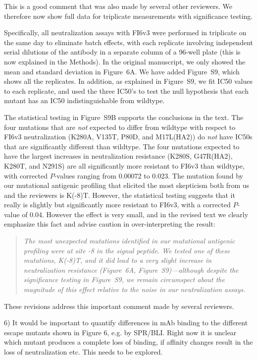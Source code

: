 \documentclass[11pt, oneside]{article}   	%
\begin{document}
{\color{black}
This is a good comment that was also made by several other reviewers.
We therefore now show full data for triplicate measurements with significance testing.

Specifically, all neutralization assays with FI6v3 were performed in triplicate on the same day to eliminate batch effects, with each replicate involving independent serial dilutions of the antibody in a separate column of a 96-well plate (this is now explained in the Methods).
In the original manuscript, we only showed the mean and standard deviation in Figure~6A.
We have added Figure~S9, which shows all the replicates.
In addition, as explained in Figure~S9, we fit IC50 values to each replicate, and used the three IC50's to test the null hypothesis that each mutant has an IC50 indistinguishable from wildtype.

The statistical testing in Figure~S9B supports the conclusions in the text. 
The four mutations that are \emph{not} expected to differ from wildtype with respect to FI6v3 neutralization (K280A, V135T, P80D, and M17L(HA2)) do \emph{not} have IC50s that are significantly different than wildtype.
The four mutations expected to have the largest increases in neutralization resistance (K280S, G47R(HA2), K280T, and N291S) are all significantly more resistant to FI6v3 than wildtype, with corrected $P$-values ranging from 0.00072 to 0.023.
The mutation found by our mutational antigenic profiling that elicited the most skepticism both from us and the reviewers is K(-8)T.
However, the statistical testing suggests that it really is slightly but significantly more resistant to FI6v3, with a corrected $P$-value of 0.04. 
However the effect is very small, and in the revised text we clearly emphasize this fact and advise caution in over-interpreting the result:

\begin{quote}
\textsl{The most unexpected mutations identified in our mutational antigenic profiling were at site -8 in the signal peptide.
We tested one of these mutations, K(-8)T, and it did lead to a very slight increase in neutralization resistance (Figure~6A, Figure~S9)---although despite the significance testing in Figure~S9, we remain circumspect about the magnitude of this effect relative to the noise in our neutralization assays.
}
\end{quote}

These revisions address this important comment made by several reviewers.
}

6) It would be important to quantify differences in mAb binding to the different escape mutants shown in Figure 6, e.g. by SPR/BLI. Right now it is unclear which mutant produces a complete loss of binding, if affinity changes result in the loss of neutralization etc. This needs to be explored.
\end{document}
